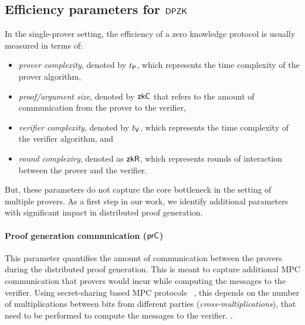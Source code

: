 \subsection{Efficiency parameters for $\mathsf{DPZK}$}
In the single-prover setting, the efficiency of a zero knowledge protocol is usually measured in terms of: 
\begin{itemize}
\item {\em prover complexity}, denoted by $t_{\mathsf{P}}$, which represents the time
complexity of the prover algorithm,
\item {\em proof/argument size}, denoted by $\mathsf{zkC}$ that refers to the amount
of communication from the prover to the verifier,
\item {\em verifier complexity}, denoted by $t_{\mathsf{V}}$, which represents the
time complexity of the verifier algorithm, and
\item {\em round complexiry}, denoted as $\mathsf{zkR}$, which represents rounds of interaction between the prover and the verifier. %
\end{itemize} 
But, these parameters do not capture the core bottleneck in the setting of multiple provers.  
As a first step in our work, we identify additional parameters with significant impact in distributed proof generation. 

\paragraph{Proof generation communication ($\mathsf{prC}$)}
This parameter quantifies the amount of communication between the provers during the
distributed proof generation. This is meant to capture additional MPC
communication that provers would incur while computing the messages to the
verifier. Using secret-sharing based MPC protocols ~\cite{GMW87, BGW88, SPDZ},
this depends on the number of multiplications between bits from different
parties ({\em cross-multiplications}), that need to be performed to compute the
messages to the verifier. 
.

